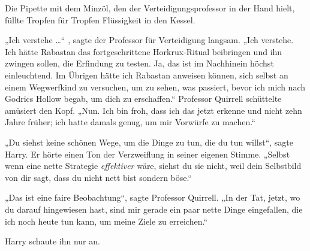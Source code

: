 Die Pipette mit dem Minzöl, den der Verteidigungsprofessor in der Hand hielt, füllte Tropfen für Tropfen Flüssigkeit in den Kessel.

„Ich verstehe …“ , sagte der Professor für Verteidigung langsam.
„Ich verstehe. Ich hätte Rabastan das fortgeschrittene Horkrux-Ritual beibringen und ihn zwingen sollen, die Erfindung zu testen. Ja, das ist im Nachhinein höchst einleuchtend. Im Übrigen hätte ich Rabastan anweisen können, sich selbst an einem Wegwerfkind zu versuchen, um zu sehen, was passiert, bevor ich mich nach Godrics Hollow begab, um dich zu erschaffen.“
Professor Quirrell schüttelte amüsiert den Kopf.
„Nun. Ich bin froh, dass ich das jetzt erkenne und nicht zehn Jahre früher; ich hatte damals genug, um mir Vorwürfe zu machen.“

„Du siehst keine schönen Wege, um die Dinge zu tun, die du tun willst“, sagte Harry.
Er hörte einen Ton der Verzweiflung in seiner eigenen Stimme.
„Selbst wenn eine nette Strategie \emph{effektiver} wäre, siehst du sie nicht, weil dein Selbstbild von dir sagt, dass du nicht nett bist sondern böse.“

„Das ist eine faire Beobachtung“, sagte Professor Quirrell.
„In der Tat, jetzt, wo du darauf hingewiesen hast, sind mir gerade ein paar nette Dinge eingefallen, die ich noch heute tun kann, um meine Ziele zu erreichen.“

Harry schaute ihn nur an.


